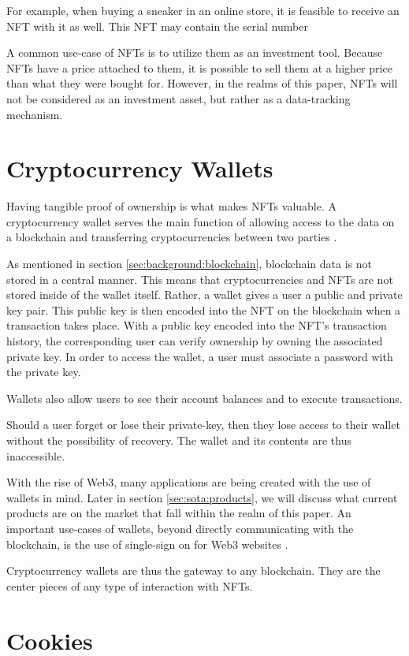 
For example, when buying a sneaker in an online store, it is feasible to receive an NFT with it as well. This NFT may contain the serial number %

A common use-case of NFTs is to utilize them as an investment tool. Because NFTs have a price attached to them, it is possible to sell them at a higher price than what they were bought for. However, in the realms of this paper, NFTs will not be considered as an investment asset, but rather as a data-tracking mechanism. %

%
%
\section{Cryptocurrency Wallets}
\label{sec:background:wallets}

Having tangible proof of ownership is what makes NFTs valuable. A cryptocurrency wallet serves the main function of allowing access to the data on a blockchain and transferring cryptocurrencies between two parties \cite{wallets1}.

As mentioned in section \ref{sec:background:blockchain}, blockchain data is not stored in a central manner. This means that cryptocurrencies and NFTs are not stored inside of the wallet itself. Rather, a wallet gives a user a public and private key pair. This public key is then encoded into the NFT on the blockchain when a transaction takes place. With a public key encoded into the NFT's transaction history, the corresponding user can verify ownership by owning the associated private key. In order to access the wallet, a user must associate a password with the private key. \cite{wallets2}

Wallets also allow users to see their account balances and to execute transactions. 

Should a user forget or lose their private-key, then they lose access to their wallet without the possibility of recovery. The wallet and its contents are thus inaccessible. \cite{wallets2}

With the rise of Web3, many applications are being created with the use of wallets in mind. Later in section \ref{sec:sota:products}, we will discuss what current products are on the market that fall within the realm of this paper. An important use-cases of wallets, beyond directly communicating with the blockchain, is the use of single-sign on for Web3 websites \cite{walletConnect}.

Cryptocurrency wallets are thus the gateway to any blockchain. They are the center pieces of any type of interaction with NFTs.

%
%
\section{Cookies}
\label{sec:background:cookies}




